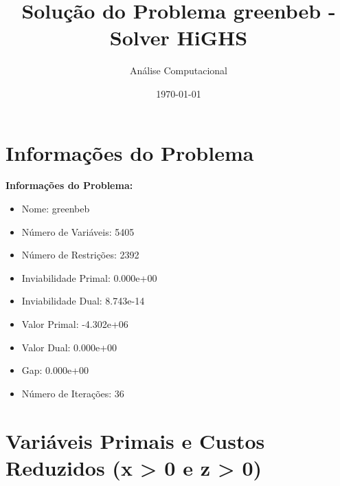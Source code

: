 \documentclass[12pt]{article}
\title{Solução do Problema greenbeb - Solver HiGHS}
\author{Análise Computacional}
\date{\today}
\begin{document}
\maketitle

\section{Informações do Problema}

\textbf{Informações do Problema:}
\begin{itemize}
\item Nome: greenbeb
\item Número de Variáveis: 5405
\item Número de Restrições: 2392
\item Inviabilidade Primal: 0.000e+00
\item Inviabilidade Dual: 8.743e-14
\item Valor Primal: -4.302e+06
\item Valor Dual: 0.000e+00
\item Gap: 0.000e+00
\item Número de Iterações: 36
\end{itemize}


\section{Variáveis Primais e Custos Reduzidos (x > 0 e z > 0)}
\end{document}

